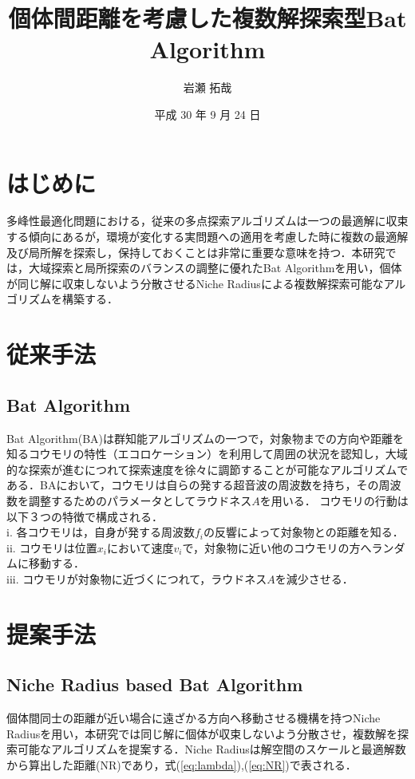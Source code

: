 \documentclass[twocolumn, a4paper]{UECIEresume}
\title{個体間距離を考慮した複数解探索型Bat Algorithm}
\date{平成 30 年 9 月 24 日}
\affiliation{情報学専攻 メディア情報学 プログラム}
\author{岩瀬 拓哉}
\begin{document}
\maketitle

\section{はじめに}
多峰性最適化問題における，従来の多点探索アルゴリズムは一つの最適解に収束する傾向にあるが，環境が変化する実問題への適用を考慮した時に複数の最適解及び局所解を探索し，保持しておくことは非常に重要な意味を持つ．本研究では，大域探索と局所探索のバランスの調整に優れたBat Algorithmを用い，個体が同じ解に収束しないよう分散させるNiche Radiusによる複数解探索可能なアルゴリズムを構築する．

\section{従来手法}
\subsection{Bat Algorithm}
Bat Algorithm(BA)は群知能アルゴリズムの一つで，対象物までの方向や距離を知るコウモリの特性（エコロケーション）を利用して周囲の状況を認知し，大域的な探索が進むにつれて探索速度を徐々に調節することが可能なアルゴリズムである\cite{BA}．BAにおいて，コウモリは自らの発する超音波の周波数を持ち，その周波数を調整するためのパラメータとしてラウドネス${A}$を用いる．
コウモリの行動は以下３つの特徴で構成される．\\
i. 各コウモリは，自身が発する周波数${f_i}$の反響によって対象物との距離を知る．\\
ii. コウモリは位置${x_i}$において速度${v_i}$で，対象物に近い他のコウモリの方へランダムに移動する．\\
iii. コウモリが対象物に近づくにつれて，ラウドネス${A}$を減少させる．

\section{提案手法}

\subsection{Niche Radius based Bat Algorithm}
個体間同士の距離が近い場合に遠ざかる方向へ移動させる機構を持つNiche Radiusを用い，本研究では同じ解に個体が収束しないよう分散させ，複数解を探索可能なアルゴリズムを提案する．Niche Radius\cite{niche}は解空間のスケールと最適解数から算出した距離(NR)であり，式(\ref{eq:lambda}),(\ref{eq:NR})で表される．
\end{document}
